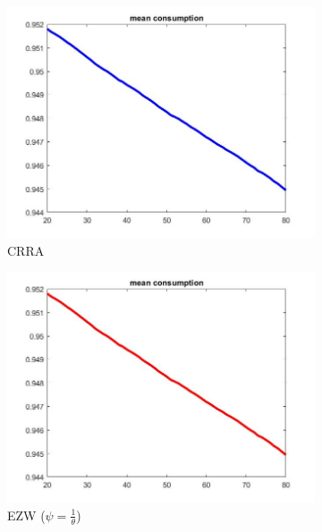 \documentclass[12pt,a4paper]{article}
\begin{document}
\begin{figure}[h!]
  \centering
  \begin{subfigure}[b]{0.32\linewidth}
    \includegraphics[width=\linewidth]{graphs/Q2/mean_cons.jpg}
    \caption{CRRA}
  \end{subfigure}
  \begin{subfigure}[b]{0.32\linewidth}
      \includegraphics[width=\linewidth]{graphs/Q4/mean_cons_ezw--.jpg}
      \caption{EZW ($\psi = \frac{1}{\theta}$)}
  \end{subfigure}
  \begin{subfigure}[b]{0.32\linewidth}

\end{subfigure}
\end{figure}
\end{document}
